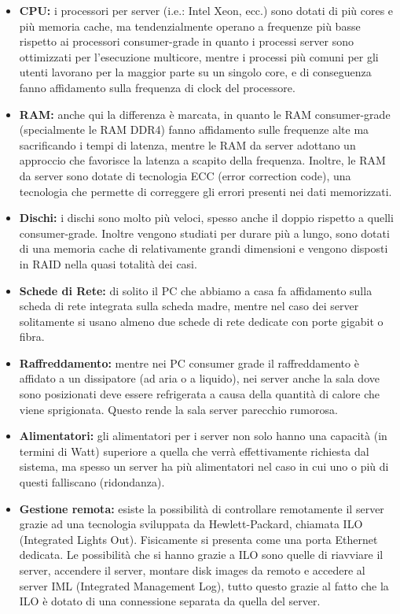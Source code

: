 \documentclass[a4paper]{report}
\begin{document}
\begin{itemize}
\item \textbf{CPU:} i processori per server (i.e.: Intel Xeon, ecc.) sono dotati di più cores e più memoria cache, ma tendenzialmente operano a frequenze più basse rispetto ai processori consumer-grade in quanto i processi server sono ottimizzati per l'esecuzione multicore, mentre i processi più comuni per gli utenti lavorano per la maggior parte su un singolo core, e di conseguenza fanno affidamento sulla frequenza di clock del processore.
\item \textbf{RAM:} anche qui la differenza è marcata, in quanto le RAM consumer-grade (specialmente le RAM DDR4) fanno affidamento sulle frequenze alte ma sacrificando i tempi di latenza, mentre le RAM da server adottano un approccio che favorisce la latenza a scapito della frequenza. Inoltre, le RAM da server sono dotate di tecnologia ECC (error correction code), una tecnologia che permette di correggere gli errori presenti nei dati memorizzati.
\item \textbf{Dischi:} i dischi sono molto più veloci, spesso anche il doppio rispetto a quelli consumer-grade. Inoltre vengono studiati per durare più a lungo, sono dotati di una memoria cache di relativamente grandi dimensioni e vengono disposti in RAID nella quasi totalità dei casi.
\item \textbf{Schede di Rete:} di solito il PC che abbiamo a casa fa affidamento sulla scheda di rete integrata sulla scheda madre, mentre nel caso dei server solitamente si usano almeno due schede di rete dedicate con porte gigabit o fibra.
\item \textbf{Raffreddamento:} mentre nei PC consumer grade il raffreddamento è affidato a un dissipatore (ad aria o a liquido), nei server anche la sala dove sono posizionati deve essere refrigerata a causa della quantità di calore che viene sprigionata. Questo rende la sala server parecchio rumorosa.
\item \textbf{Alimentatori:} gli alimentatori per i server non solo hanno una capacità (in termini di Watt) superiore a quella che verrà effettivamente richiesta dal sistema, ma spesso un server ha più alimentatori nel caso in cui uno o più di questi falliscano (ridondanza). 
\item \textbf{Gestione remota:} esiste la possibilità di controllare remotamente il server grazie ad una tecnologia sviluppata da Hewlett-Packard, chiamata ILO (Integrated Lights Out). Fisicamente si presenta come una porta Ethernet dedicata. Le possibilità che si hanno grazie a ILO sono quelle di riavviare il server, accendere il server, montare disk images da remoto e accedere al server IML (Integrated Management Log), tutto questo grazie al fatto che la ILO è dotato di una connessione separata da quella del server.
\end{itemize}
\end{document}
